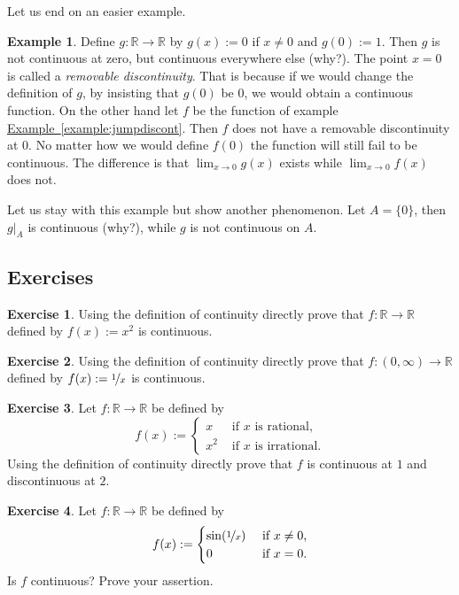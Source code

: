 \documentclass[12pt]{book}
\newcommand{\R}{{\mathbb{R}}}
\newcommand{\myindex}[1]{#1\index{#1}}
\theoremstyle{plain}
\theoremstyle{remark}
\theoremstyle{definition}
\theoremstyle{exercise}
\newtheorem{exercise}{Exercise}[section]
\theoremstyle{example}
\newtheorem{example}[thm]{Example}
\newcommand{\exampleref}[1]{\hyperref[#1]{Example~\ref*{#1}}}
\begin{document}
Let us end on an easier example.

\begin{example}
Define
$g \colon \R \to \R$ by $g(x) := 0$ if $x \not= 0$ and
$g(0) := 1$.  Then $g$ is not continuous at zero, but continuous everywhere else (why?).
The point $x=0$ is called a \emph{\myindex{removable discontinuity}}.  That
is because if we would change the definition of $g$, by insisting that
$g(0)$ be $0$, we would obtain a continuous function.  On the other hand
let $f$ be the function of example \exampleref{example:jumpdiscont}.
Then $f$ does not have a
removable discontinuity at $0$.  No matter how we would define $f(0)$ the function
will still fail to be continuous.  The difference is that 
$\lim_{x\to 0} g(x)$ exists while
$\lim_{x\to 0} f(x)$ does not.

Let us stay with this example but show another phenomenon.  Let $A = \{ 0
\}$, then $g|_A$ is continuous (why?), while $g$ is not continuous on $A$.
\end{example}

\subsection{Exercises}

\begin{exercise}
Using the definition of continuity directly prove that
$f \colon \R \to \R$ defined by
$f(x) := x^2$ is continuous.
\end{exercise}

\begin{exercise}
Using the definition of continuity directly prove that
$f \colon (0,\infty) \to \R$ defined by
$f(x) := \nicefrac{1}{x}$ is continuous.
\end{exercise}

\begin{exercise}
Let $f \colon \R \to \R$ be defined by
\begin{equation*}
f(x) :=
\begin{cases}
x & \text{ if $x$ is rational,} \\
x^2 & \text{ if $x$ is irrational.}
\end{cases}
\end{equation*}
Using the definition of continuity directly prove that
$f$ is continuous at $1$ and discontinuous at $2$.
\end{exercise}

\begin{exercise}
Let $f \colon \R \to \R$ be
defined by
\begin{equation*}
f(x) :=
\begin{cases}
\sin(\nicefrac{1}{x}) & \text{ if $x \not= 0$,} \\
0 & \text{ if $x=0$.}
\end{cases}
\end{equation*}
Is $f$ continuous?  Prove your assertion.
\end{exercise}
\end{document}
